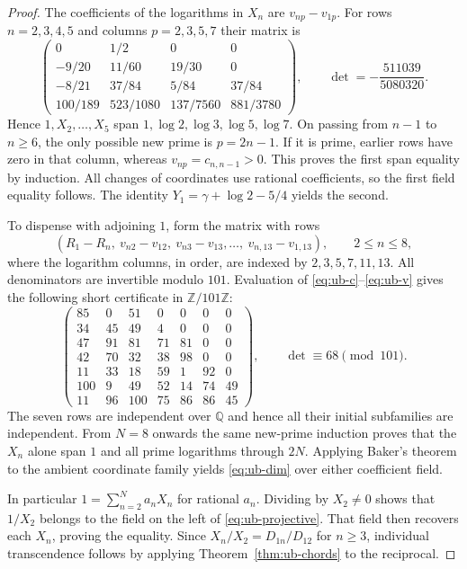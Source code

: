 \documentclass[11pt,a4paper]{article}
\theoremstyle{definition}\newtheorem{definition}[theorem]{Definition}\newtheorem{example}[theorem]{Example}
\theoremstyle{remark}\newtheorem{remark}[theorem]{Remark}
\newcommand{\Q}{\mathbb Q}\newcommand{\Z}{\mathbb Z}\newcommand{\R}{\mathbb R}\newcommand{\N}{\mathbb N}
\begin{document}
\begin{proof}
The coefficients of the logarithms in $X_n$ are $v_{np}-v_{1p}$.
For rows $n=2,3,4,5$ and columns $p=2,3,5,7$ their matrix is
\[
 \begin{pmatrix}
 0&1/2&0&0\\
 -9/20&11/60&19/30&0\\
 -8/21&37/84&5/84&37/84\\
 100/189&523/1080&137/7560&881/3780
 \end{pmatrix},
 \qquad \det=-\frac{511039}{5080320}.
\]
Hence $1,X_2,\ldots,X_5$ span $1,\log2,\log3,\log5,\log7$.
On passing from $n-1$ to $n\ge6$, the only possible new prime is
$p=2n-1$. If it is prime, earlier rows have zero in that column,
whereas $v_{np}=c_{n,n-1}>0$. This proves the first span equality by
induction. All changes of coordinates use rational coefficients, so
the first field equality follows. The identity
$Y_1=\gamma+\log2-5/4$ yields the second.

To dispense with adjoining $1$, form the matrix with rows
\[
 (R_1-R_n,\ v_{n2}-v_{12},\ v_{n3}-v_{13},\ldots,\
                  v_{n,13}-v_{1,13}),\qquad 2\le n\le8,
\]
where the logarithm columns, in order, are indexed by $2,3,5,7,11,13$.
All denominators are invertible modulo $101$. Evaluation of
\eqref{eq:ub-c}--\eqref{eq:ub-v} gives the following short
certificate in $\Z/101\Z$:
\[
 \begin{pmatrix}
 85&0&51&0&0&0&0\\
 34&45&49&4&0&0&0\\
 47&91&81&71&81&0&0\\
 42&70&32&38&98&0&0\\
 11&33&18&59&1&92&0\\
 100&9&49&52&14&74&49\\
 11&96&100&75&86&86&45
 \end{pmatrix},
 \qquad \det\equiv68\pmod{101}.
\]
The seven rows are independent over $\Q$ and hence all their
initial subfamilies are independent. From $N=8$ onwards the same
new-prime induction proves that the $X_n$ alone span $1$ and all
prime logarithms through $2N$. Applying Baker's theorem to the
ambient coordinate family yields \eqref{eq:ub-dim} over either
coefficient field.

In particular $1=\sum_{n=2}^N a_n X_n$ for rational $a_n$.
Dividing by $X_2\ne0$ shows that $1/X_2$ belongs to the field on the
left of \eqref{eq:ub-projective}. That field then recovers each
$X_n$, proving the equality. Since $X_n/X_2=D_{1n}/D_{12}$ for
$n\ge3$, individual transcendence follows by applying
Theorem~\ref{thm:ub-chords} to the reciprocal.
\end{proof}
\end{document}
